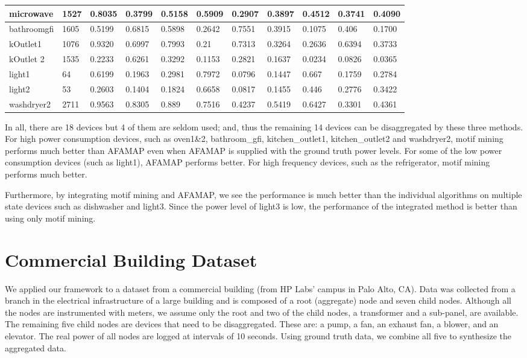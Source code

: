 \begin{table}[!t]
\begin{minipage}[t]{1.0\linewidth}
{\begin{tabular} {|l|p{7mm}|l|l|l|l|l|l|l|l|l|}
\hline
microwave & 1527& 0.8035 & 0.3799 & 0.5158 &0.5909 &0.2907 &0.3897 &  0.4512 & 0.3741 & 0.4090  \\
\hline
bathroomgfi & 1605& 0.5199 & 0.6815 & 0.5898 & 0.2642 & 0.7551 &0.3915 &  0.1075 & 0.406 & 0.1700   \\
\hline
kOutlet1 & 1076& 0.9320 & 0.6997 & 0.7993 & 0.21 &0.7313 &0.3264&   0.2636 & 0.6394 & 0.3733   \\
\hline
kOutlet 2 &1535 &  0.2233 & 0.6261 & 0.3292 &0.1153 &0.2821 &0.1637 &  0.0234 & 0.0826 & 0.0365  \\
\hline
light1 & 64 & 0.6199 & 0.1963 & 0.2981 & 0.7972 & 0.0796 &0.1447 &  0.667 & 0.1759 & 0.2784  \\
\hline
light2 &53 & 0.2603 &0.1404 &0.1824 &0.6658 &0.0817 &0.1455 &  0.446 & 0.2776 & 0.3422  \\
\hline
washdryer2 &2711 & 0.9563 & 0.8305 & 0.889 & 0.7516 & 0.4237 & 0.5419 &  0.6427 & 0.3301 & 0.4361   \\
\hline
\end{tabular}
}
\end{minipage}%
\end{table}

In all, there are 18 devices but 4 of them are seldom used; and, thus
the remaining 14 devices can be disaggregated by these three methods.
For high power consumption devices, such as oven1\&2, bathroom\_gfi,
kitchen\_outlet1, kitchen\_outlet2 and washdryer2, motif mining performs much better than
AFAMAP even when AFAMAP is supplied with the ground truth power levels.
For some of the low power consumption devices
(such as light1), AFAMAP performs better.
For high frequency devices, such as the refrigerator, motif mining performs much better.

Furthermore, by integrating motif mining and AFAMAP, we see
the performance is much better than the individual algorithms
on multiple state devices such as dishwasher and light3.
Since the power level of light3 is low, the performance
of the integrated method is better than using
only motif mining.

%
\section{Commercial Building Dataset}
We applied our framework to a
dataset from a commercial building (from HP Labs' campus in Palo Alto, CA).
Data was collected from a branch in the electrical infrastructure of a large
building and is composed of a root (aggregate) node and seven child
nodes. Although all the nodes are instrumented with meters, we assume only
the root and two of the child nodes, a transformer and a sub-panel, are
available.
The remaining five child nodes are devices that need to be
disaggregated. These are: a pump, a fan, an exhaust fan, a blower, and an
elevator.
The real power of all nodes are logged at intervals of 10 seconds.
Using ground truth data, we combine all five to synthesize the aggregated data.

